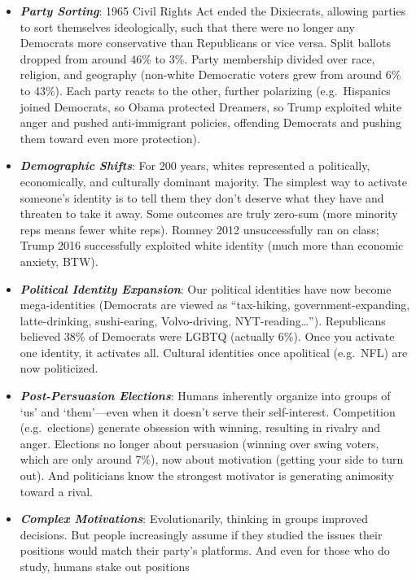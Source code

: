 \documentclass[
]{article}
\begin{document}
\begin{itemize}
\item
  \textbf{\emph{Party Sorting}}: 1965 Civil Rights Act ended the
  Dixiecrats, allowing parties to sort themselves ideologically, such
  that there were no longer any Democrats more conservative than
  Republicans or vice versa. Split ballots dropped from around 46\% to
  3\%. Party membership divided over race, religion, and geography
  (non-white Democratic voters grew from around 6\% to 43\%). Each party
  reacts to the other, further polarizing (e.g.~Hispanics joined
  Democrats, so Obama protected Dreamers, so Trump exploited white anger
  and pushed anti-immigrant policies, offending Democrats and pushing
  them toward even more protection).
\item
  \textbf{\emph{Demographic Shifts}}: For 200 years, whites represented
  a politically, economically, and culturally dominant majority. The
  simplest way to activate someone's identity is to tell them they don't
  deserve what they have and threaten to take it away. Some outcomes are
  truly zero-sum (more minority reps means fewer white reps). Romney
  2012 unsuccessfully ran on class; Trump 2016 successfully exploited
  white identity (much more than economic anxiety, BTW).
\item
  \textbf{\emph{Political Identity Expansion}}: Our political identities
  have now become mega-identities (Democrats are viewed as ``tax-hiking,
  government-expanding, latte-drinking, sushi-earing, Volvo-driving,
  NYT-reading\ldots{}''). Republicans believed 38\% of Democrats were
  LGBTQ (actually 6\%). Once you activate one identity, it activates
  all. Cultural identities once apolitical (e.g.~NFL) are now
  politicized.
\item
  \textbf{\emph{Post-Persuasion Elections}}: Humans inherently organize
  into groups of `us' and `them'---even when it doesn't serve their
  self-interest. Competition (e.g.~elections) generate obsession with
  winning, resulting in rivalry and anger. Elections no longer about
  persuasion (winning over swing voters, which are only around 7\%), now
  about motivation (getting your side to turn out). And politicians know
  the strongest motivator is generating animosity toward a rival.
\item
  \textbf{\emph{Complex Motivations}}: Evolutionarily, thinking in
  groups improved decisions. But people increasingly assume if they
  studied the issues their positions would match their party's
  platforms. And even for those who do study, humans stake out positions

\end{itemize}
\end{document}
